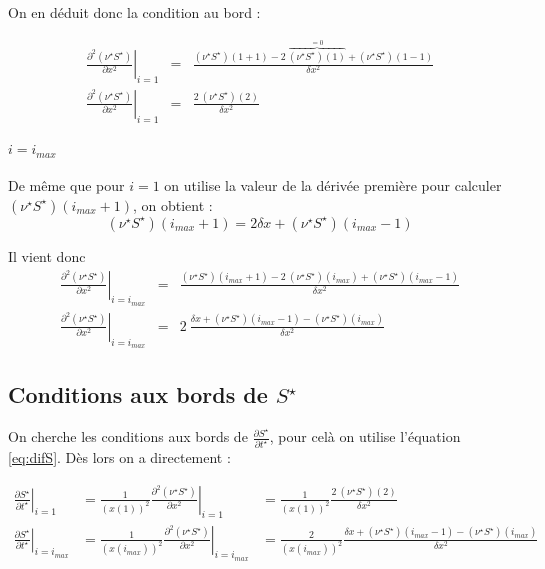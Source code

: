 On en déduit donc la condition au bord :

\begin{eqnarray}
  \left. \frac{\partial^2 (\nu^{\star} S^{\star})}{\partial x^2}\right|_{i=1} &=& \frac{(\nu^{\star} S^{\star})(1+1) -2\ \overbrace{(\nu^{\star} S^{\star})(1)}^{=0}+ (\nu^{\star} S^{\star})(1-1)}{\delta x ^2} \\
  \left. \frac{\partial^2 (\nu^{\star} S^{\star})}{\partial x^2}\right|_{i=1} &=& \frac{2\ (\nu^{\star} S^{\star})(2)}{\delta x ^2}
\end{eqnarray}

\paragraph{$i=i_{max}$}
De même que pour $i=1$ on utilise la valeur de la dérivée première pour calculer $(\nu^{\star} S^{\star})(i_{max}+1)$, on obtient :
\begin{equation}
  (\nu^{\star} S^{\star})(i_{max}+1)=2\delta x + (\nu^{\star} S^{\star})(i_{max}-1)
\end{equation}

Il vient donc 
\begin{eqnarray}
  \left. \frac{\partial^2 (\nu^{\star} S^{\star})}{\partial x^2}\right|_{i=i_{max}} &=& \frac{(\nu^{\star} S^{\star})(i_{max}+1) - 2\ (\nu^{\star} S^{\star})(i_{max}) + (\nu^{\star} S^{\star})(i_{max}-1)}{\delta x^2}\\
  \left. \frac{\partial^2 (\nu^{\star} S^{\star})}{\partial x^2}\right|_{i=i_{max}} &=& 2\ \frac{\delta x + (\nu^{\star} S^{\star})(i_{max}-1)- (\nu^{\star} S^{\star})(i_{max})}{\delta x^2}
\end{eqnarray}

\subsection{Conditions aux bords de $S^{\star}$}
On cherche les conditions aux bords de $\frac{\partial S^{\star}}{\partial t^{\star}}$, pour celà on utilise l'équation \eqref{eq:difS}. Dès lors on a directement :

\begin{eqnarray}
  \left. \frac{\partial S^{\star}}{\partial t^{\star}} \right|_{i=1} &= \frac{1}{(x(1))^2} \left. \frac{\partial^2 (\nu^{\star} S^{\star})}{\partial x^2}\right|_{i=1} &= \frac{1}{(x(1))^2} \frac{2\ (\nu^{\star} S^{\star})(2)}{\delta x ^2}\\
  \left. \frac{\partial S^{\star}}{\partial t^{\star}} \right|_{i=i_{max}}&= \frac{1}{(x(i_{max}))^2} \left. \frac{\partial^2 (\nu^{\star} S^{\star})}{\partial x^2}\right|_{i=i_{max}} &= \frac{2}{(x(i_{max}))^2} \frac{\delta x + (\nu^{\star} S^{\star})(i_{max}-1)- (\nu^{\star} S^{\star})(i_{max})}{\delta x^2}
\end{eqnarray}

